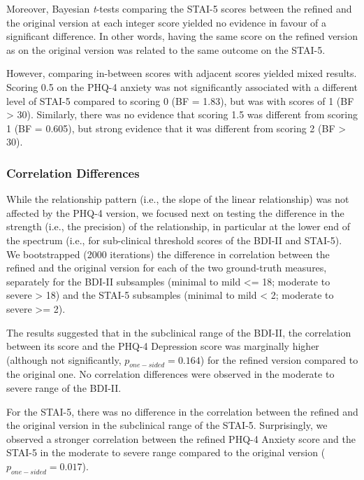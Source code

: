 \documentclass[
  jou,
  longtable,
  nolmodern,
  notxfonts,
  notimes,
  mask,
  colorlinks=true,linkcolor=blue,citecolor=blue,urlcolor=blue]{apa7}
\begin{document}
Moreover, Bayesian \emph{t}-tests comparing the STAI-5 scores between
the refined and the original version at each integer score yielded no
evidence in favour of a significant difference. In other words, having
the same score on the refined version as on the original version was
related to the same outcome on the STAI-5.

However, comparing in-between scores with adjacent scores yielded mixed
results. Scoring 0.5 on the PHQ-4 anxiety was not significantly
associated with a different level of STAI-5 compared to scoring 0 (BF =
1.83), but was with scores of 1 (BF \textgreater{} 30). Similarly, there
was no evidence that scoring 1.5 was different from scoring 1 (BF =
0.605), but strong evidence that it was different from scoring 2 (BF
\textgreater{} 30).

\subsubsection{Correlation Differences}\label{correlation-differences}

While the relationship pattern (i.e., the slope of the linear
relationship) was not affected by the PHQ-4 version, we focused next on
testing the difference in the strength (i.e., the precision) of the
relationship, in particular at the lower end of the spectrum (i.e., for
sub-clinical threshold scores of the BDI-II and STAI-5). We bootstrapped
(2000 iterations) the difference in correlation between the refined and
the original version for each of the two ground-truth measures,
separately for the BDI-II subsamples (minimal to mild \textless= 18;
moderate to severe \textgreater{} 18) and the STAI-5 subsamples (minimal
to mild \textless{} 2; moderate to severe \textgreater= 2).

The results suggested that in the subclinical range of the BDI-II, the
correlation between its score and the PHQ-4 Depression score was
marginally higher (although not significantly,
\(p_{one-sided} = 0.164\)) for the refined version compared to the
original one. No correlation differences were observed in the moderate
to severe range of the BDI-II.

For the STAI-5, there was no difference in the correlation between the
refined and the original version in the subclinical range of the STAI-5.
Surprisingly, we observed a stronger correlation between the refined
PHQ-4 Anxiety score and the STAI-5 in the moderate to severe range
compared to the original version (\(p_{one-sided} = 0.017\)).
\end{document}
